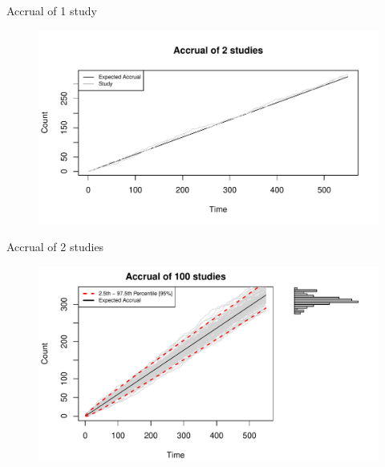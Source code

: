 \documentclass[english]{beamer}\usepackage[]{graphicx}\usepackage[]{xcolor}
\makeatletter
\def\maxwidth{ %
  \ifdim\Gin@nat@width>\linewidth
    \linewidth
  \else
    \Gin@nat@width
  \fi
}
\newenvironment{knitrout}{}{} %
\makeatother
\begin{document}
\begin{frame}{Accrual of 1 study}

\begin{figure}

\begin{knitrout}
\color{fgcolor}
\includegraphics[width=\maxwidth]{figures/figunnamed-chunk-3-1} 
\end{knitrout}
 
\end{figure}


\end{frame}

\begin{frame}{Accrual of 2 studies}

\begin{figure}

\begin{knitrout}
\color{fgcolor}
\includegraphics[width=\maxwidth]{figures/figunnamed-chunk-4-1} 
\end{knitrout}
  
\end{figure}


\end{frame}
\end{document}
